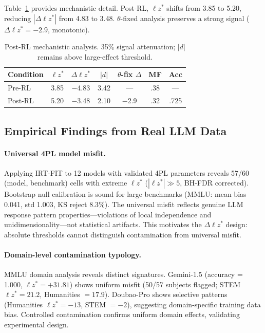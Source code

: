 \documentclass[11pt,a4paper]{article}
\begin{document}
Table~\ref{tab:post_rl_mechanism} provides mechanistic detail.
Post-RL, $\ell z^*$ shifts from 3.85 to 5.20, reducing $|\Delta \ell z^*|$ from 4.83 to 3.48.
$\theta$-fixed analysis preserves a strong signal ($\Delta \ell z^* = -2.9$, monotonic).

\begin{table}[h]
\centering
\small
\begin{tabular}{lcccccc}
\toprule
Condition & $\ell z^*$ & $\Delta \ell z^*$ & $|d|$ & $\theta$-fix $\Delta$ & MF & Acc \\
\midrule
Pre-RL & 3.85 & $-$4.83 & 3.42 & --- & .38 & --- \\
Post-RL & 5.20 & $-$3.48 & 2.10 & $-$2.9 & .32 & .725 \\
\bottomrule
\end{tabular}
\caption{Post-RL mechanistic analysis. 35\% signal attenuation; $|d|$ remains above large-effect threshold.}
\label{tab:post_rl_mechanism}
\end{table}

\subsection{Empirical Findings from Real LLM Data}
\label{sec:empirical}

\paragraph{Universal 4PL model misfit.}
Applying IRT-FIT to 12 models with validated 4PL parameters reveals 57/60 (model, benchmark) cells with extreme $\ell z^*$ ($|\ell z^*| \gg 5$, BH-FDR corrected).
Bootstrap null calibration is sound for large benchmarks (MMLU: mean bias 0.041, std 1.003, KS reject 8.3\%).
The universal misfit reflects genuine LLM response pattern properties---violations of local independence and unidimensionality---not statistical artifacts.
This motivates the $\Delta \ell z^*$ design: absolute thresholds cannot distinguish contamination from universal misfit.

\paragraph{Domain-level contamination typology.}
MMLU domain analysis reveals distinct signatures.
Gemini-1.5 (accuracy = 1.000, $\ell z^* = +31.81$) shows uniform misfit (50/57 subjects flagged; STEM $\ell z^* = 21.2$, Humanities $= 17.9$).
Doubao-Pro shows selective patterns (Humanities $\ell z^* = -13$, STEM $= -2$), suggesting domain-specific training data bias.
Controlled contamination confirms uniform domain effects, validating experimental design.
\end{document}
